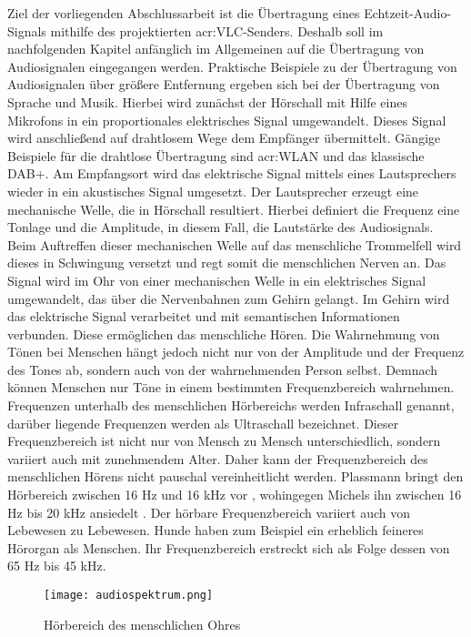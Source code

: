 Ziel der vorliegenden Abschlussarbeit ist die Übertragung eines Echtzeit-Audio-Signals mithilfe des projektierten \gls{acr:VLC}-Senders. Deshalb soll im nachfolgenden Kapitel anfänglich im Allgemeinen auf die Übertragung von Audiosignalen eingegangen werden. Praktische Beispiele zu der Übertragung von Audiosignalen über größere Entfernung ergeben sich bei der Übertragung von Sprache und Musik. Hierbei wird zunächst der Hörschall mit Hilfe eines Mikrofons in ein proportionales elektrisches Signal umgewandelt. Dieses Signal wird anschließend auf drahtlosem  Wege dem Empfänger übermittelt. Gängige Beispiele für die drahtlose Übertragung sind \gls{acr:WLAN} und das klassische DAB+. Am Empfangsort wird das elektrische Signal mittels eines Lautsprechers wieder in ein akustisches Signal umgesetzt.\cite{plassmannHandbuchElektrotechnik2016} Der Lautsprecher erzeugt eine mechanische Welle, die in Hörschall resultiert. Hierbei definiert die Frequenz eine Tonlage und die Amplitude, in diesem Fall, die Lautstärke des Audiosignals. Beim Auftreffen dieser mechanischen Welle auf das menschliche Trommelfell wird dieses in Schwingung versetzt und regt somit die menschlichen Nerven an. Das Signal wird im Ohr von einer mechanischen Welle in ein elektrisches Signal umgewandelt, das über die Nervenbahnen zum Gehirn gelangt. Im Gehirn wird das elektrische Signal verarbeitet und mit semantischen Informationen verbunden. Diese ermöglichen das menschliche Hören.\cite{stotzaudio} Die Wahrnehmung von Tönen bei Menschen hängt jedoch nicht nur von der Amplitude und der Frequenz des Tones ab, sondern auch von der wahrnehmenden Person selbst. Demnach können Menschen nur Töne in einem bestimmten Frequenzbereich wahrnehmen. Frequenzen unterhalb des menschlichen Hörbereichs werden Infraschall genannt, darüber liegende Frequenzen werden als Ultraschall bezeichnet. Dieser Frequenzbereich ist nicht nur von Mensch zu Mensch unterschiedlich, sondern variiert auch mit zunehmendem Alter. Daher kann der Frequenzbereich des menschlichen Hörens nicht pauschal vereinheitlicht werden. Plassmann bringt den Hörbereich zwischen 16 Hz und 16 kHz vor \cite{plassmannHandbuchElektrotechnik2016}, wohingegen Michels ihn zwischen 16 Hz bis 20 kHz ansiedelt \cite{michelsSonographieOrganUnd2012}. Der hörbare Frequenzbereich variiert auch von Lebewesen zu Lebewesen. Hunde haben zum Beispiel ein erheblich feineres Hörorgan als Menschen. Ihr Frequenzbereich erstreckt sich als Folge dessen von 65 Hz bis 45 kHz.\cite{michelsSonographieOrganUnd2012}

\begin{figure}[H]
	\centering
	\texttt{[image: audiospektrum.png]}
	\caption[Hörbereich des menschlichen Ohres]{Hörbereich des menschlichen Ohres} \cite{michelsSonographieOrganUnd2012}
	\label{fig:audiospektrum}
\end{figure}

